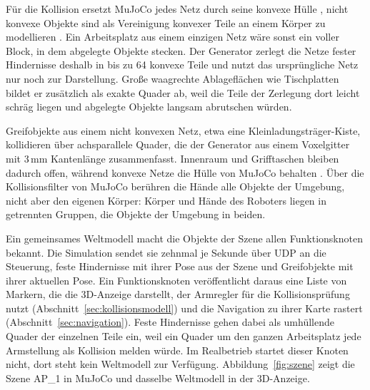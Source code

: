 Für die Kollision ersetzt MuJoCo jedes Netz durch seine konvexe Hülle \cite{MujocoDoku2026}, nicht konvexe Objekte sind als Vereinigung konvexer Teile an einem Körper zu modellieren \cite{MujocoDoku2026}.
Ein Arbeitsplatz aus einem einzigen Netz wäre sonst ein voller Block, in dem abgelegte Objekte stecken.
Der Generator zerlegt die Netze fester Hindernisse deshalb in bis zu 64 konvexe Teile  und nutzt das ursprüngliche Netz nur noch zur Darstellung.
Große waagrechte Ablageflächen wie Tischplatten bildet er zusätzlich als exakte Quader ab, weil die Teile der Zerlegung dort leicht schräg liegen und abgelegte Objekte langsam abrutschen würden.

Greifobjekte aus einem nicht konvexen Netz, etwa eine Kleinladungsträger-Kiste, kollidieren über achsparallele Quader, die der Generator aus einem Voxelgitter mit 3\,mm Kantenlänge zusammenfasst.
Innenraum und Grifftaschen bleiben dadurch offen, während konvexe Netze die Hülle von MuJoCo behalten .
Über die Kollisionsfilter von MuJoCo \cite{MujocoDoku2026} berühren die Hände alle Objekte der Umgebung, nicht aber den eigenen Körper: Körper und Hände des Roboters liegen in getrennten Gruppen, die Objekte der Umgebung in beiden.

Ein gemeinsames Weltmodell macht die Objekte der Szene allen Funktionsknoten bekannt.
Die Simulation sendet sie zehnmal je Sekunde über UDP an die Steuerung, feste Hindernisse mit ihrer Pose aus der Szene und Greifobjekte mit ihrer aktuellen Pose.
Ein Funktionsknoten veröffentlicht daraus eine Liste von Markern, die die 3D-Anzeige darstellt, der Armregler für die Kollisionsprüfung nutzt (Abschnitt~\ref{sec:kollisionsmodell}) und die Navigation zu ihrer Karte rastert (Abschnitt~\ref{sec:navigation}).
Feste Hindernisse gehen dabei als umhüllende Quader der einzelnen Teile ein, weil ein Quader um den ganzen Arbeitsplatz jede Armstellung als Kollision melden würde.
Im Realbetrieb startet dieser Knoten nicht, dort steht kein Weltmodell zur Verfügung.
Abbildung~\ref{fig:szene} zeigt die Szene AP\_1 in MuJoCo und dasselbe Weltmodell in der 3D-Anzeige.

